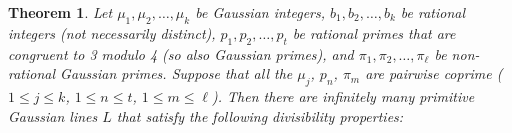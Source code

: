 \documentclass[11pt]{article}
\newtheorem{theorem}{Theorem}
\newcommand{\DL}{{\mathcal{D}}(L)}
\begin{document}
\begin{theorem} \label{newchinese}
Let $\mu_1, \mu_2, \ldots, \mu_k$ be Gaussian integers, 
$b_1, b_2, \ldots, b_k$ be rational integers  (not necessarily distinct), 
$p_1,p_2,\ldots, p_t$ be rational primes that are congruent to 3 modulo 4 (so also Gaussian primes), and 
$\pi_1,\pi_2,\ldots, \pi_\ell$ be non-rational Gaussian primes. 
Suppose that all the $\mu_j$, $p_n$, $\pi_m$ are pairwise coprime ($1\leq j\leq k$, $1 \leq n\leq t$, $1 \leq m\leq \ell$).
Then there are infinitely many primitive Gaussian lines  $L$ that satisfy the following 
 divisibility 
 properties:
 \begin{quote} 
\end{quote}
\end{theorem}
\smallskip
\end{document}
